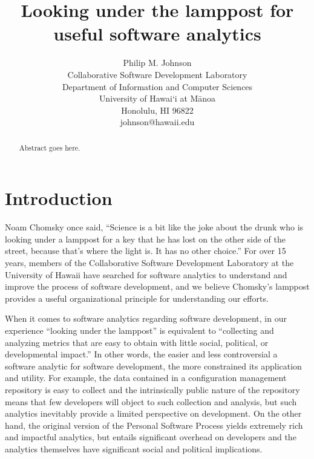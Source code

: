 \documentclass[]{article}
\begin{document}


\title{{\bf Looking under the lamppost for useful software analytics}}

\author{Philip M. Johnson\\
        Collaborative Software Development Laboratory\\
        Department of Information and Computer Sciences\\
        University of Hawai`i at M\=anoa\\
        Honolulu, HI 96822\\
        johnson@hawaii.edu\\
}


\maketitle

\begin{abstract}  %
Abstract goes here.
\end{abstract}

\thispagestyle{empty}


\setlength{\parskip}{3pt plus 1pt minus 1pt} 

\section{Introduction}
Noam Chomsky once said, ``Science is a bit like the joke about the drunk who is looking
under a lamppost for a key that he has lost on the other side of the street, because
that's where the light is. It has no other choice.''  For over 15 years, members of the
Collaborative Software Development Laboratory at the University of Hawaii have searched
for software analytics to understand and improve the process of software development, and
we believe Chomsky's lamppost provides a useful organizational principle for understanding our
efforts.

When it comes to software analytics regarding software development, in our experience
``looking under the lamppost'' is equivalent to ``collecting and analyzing metrics that
are easy to obtain with little social, political, or developmental impact.''  In other
words, the easier and less controversial a software analytic for software development, the
more constrained its application and utility.  For example, the data contained in a
configuration management repository is easy to collect and the intrinsically public nature
of the repository means that few developers will object to such collection and analysis,
but such analytics inevitably provide a limited perspective on development.  On the other
hand, the original version of the Personal Software Process yields extremely rich and
impactful analytics, but entails significant overhead on developers and the analytics
themselves have significant social and political implications.
\end{document}
